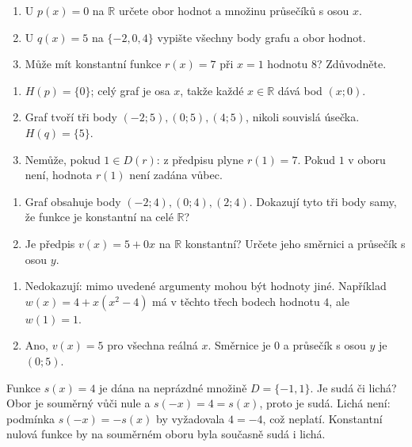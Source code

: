 \documentclass[11pt,a4paper]{article}
\begin{document}
\begin{zadaniReseniBox}
\begin{enumerate}[label=\alph*)]
\item U $p(x)=0$ na $\mathbb R$ určete obor hodnot a množinu průsečíků s osou $x$.
\item U $q(x)=5$ na $\{-2,0,4\}$ vypište všechny body grafu a obor hodnot.
\item Může mít konstantní funkce $r(x)=7$ při $x=1$ hodnotu $8$? Zdůvodněte.
\end{enumerate}
\tcblower
\begin{enumerate}[label=\alph*)]
\item $H(p)=\{0\}$; celý graf je osa $x$, takže každé $x\in\mathbb R$ dává bod $(x;0)$.
\item Graf tvoří tři body $(-2;5),(0;5),(4;5)$, nikoli souvislá úsečka. $H(q)=\{5\}$.
\item Nemůže, pokud $1\in D(r)$: z předpisu plyne $r(1)=7$. Pokud $1$ v oboru není, hodnota $r(1)$ není zadána vůbec.
\end{enumerate}
\end{zadaniReseniBox}
\begin{zadaniReseniBox}[title={Diagnostika: co skutečně určuje graf?}]
\begin{enumerate}[label=\alph*)]
\item Graf obsahuje body $(-2;4),(0;4),(2;4)$. Dokazují tyto tři body samy, že funkce je konstantní na celé $\mathbb R$?
\item Je předpis $v(x)=5+0x$ na $\mathbb R$ konstantní? Určete jeho směrnici a průsečík s osou $y$.
\end{enumerate}
\tcblower
\begin{enumerate}[label=\alph*)]
\item Nedokazují: mimo uvedené argumenty mohou být hodnoty jiné. Například $w(x)=4+x(x^2-4)$ má v těchto třech bodech hodnotu $4$, ale $w(1)=1$.
\item Ano, $v(x)=5$ pro všechna reálná $x$. Směrnice je $0$ a průsečík s osou $y$ je $(0;5)$.
\end{enumerate}
\end{zadaniReseniBox}
\begin{zadaniReseniBox}
Funkce $s(x)=4$ je dána na neprázdné množině $D=\{-1,1\}$. Je sudá či lichá?
\tcblower
Obor je souměrný vůči nule a $s(-x)=4=s(x)$, proto je sudá. Lichá není: podmínka $s(-x)=-s(x)$ by vyžadovala $4=-4$, což neplatí. Konstantní nulová funkce by na souměrném oboru byla současně sudá i lichá.
\end{zadaniReseniBox}
\end{document}
